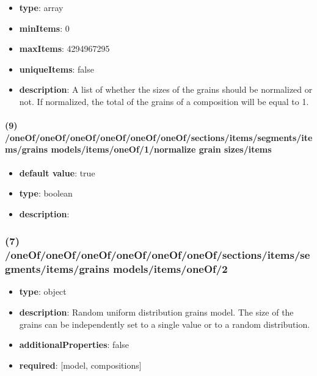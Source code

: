 \begin{itemize}[leftmargin=8em]\item {\bf type}: array
\item {\bf minItems}: 0
\item {\bf maxItems}: 4294967295
\item {\bf uniqueItems}: false
\item {\bf description}: A list of whether the sizes of the grains should be normalized or not. If normalized, the total of the grains of a composition will be equal to 1.
\end{itemize}\paragraph{(9) /oneOf/oneOf/oneOf/oneOf/oneOf/oneOf/sections/items/segments/items/grains models/items/oneOf/1/normalize grain sizes/items}
\begin{itemize}[leftmargin=9em]\item {\bf default value}: true
\item {\bf type}: boolean
\item {\bf description}: 
\end{itemize}\subsubsection{(7) /oneOf/oneOf/oneOf/oneOf/oneOf/oneOf/sections/items/segments/items/grains models/items/oneOf/2}
\begin{itemize}[leftmargin=7em]\item {\bf type}: object
\item {\bf description}: Random uniform distribution grains model. The size of the grains can be independently set to a single value or to a random distribution.
\item {\bf additionalProperties}: false
\item {\bf required}: [model, compositions]\end{itemize}
